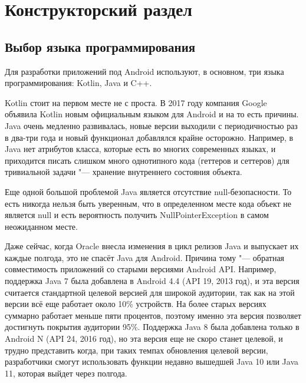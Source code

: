\chapter{Конструкторский раздел}
\label{ch:design}

\section{Выбор языка программирования}
\label{sec:language}
Для разработки приложений под Android используют, в основном, три языка программирования: Kotlin, Java и C++.

Kotlin стоит на первом месте не с проста.
В 2017 году компания Google объявила Kotlin новым официальным языком для Android и на то есть причины.
Java очень медленно развивалась, новые версии выходили с периодичностью раз в два-три года и новый функционал добавлялся крайне осторожно.
Например, в Java нет атрибутов класса, которые есть во многих современных языках, и приходится писать слишком много однотипного кода (геттеров и сеттеров) для тривиальной задачи "--- хранение внутреннего состояния объекта.

Еще одной большой проблемой Java является отсутствие null-безопасности.
То есть никогда нельзя быть уверенным, что в определенном месте кода объект не является null и есть вероятность получить NullPointerException в самом неожиданном месте.

Даже сейчас, когда Oracle внесла изменения в цикл релизов Java и выпускает их каждые полгода, это не спасёт Java для Android.
Причина тому "--- обратная совместимость приложений со старыми версиями Android API\@.
Например, поддержка Java 7 была добавлена в Android 4.4 (API 19, 2013 год), и эта версия считается стандартной целевой версией для широкой аудитории, так как на этой версии всё еще работает около 10\% устройств.
На более старых версиях суммарно работает меньше пяти процентов, поэтому именно эта версия позволяет достигнуть покрытия аудитории 95\%.
Поддержка Java 8 была добавлена только в Android N (API 24, 2016 год), но эта версия еще не скоро станет целевой, и трудно представить когда, при таких темпах обновления целевой версии, разработчики смогут использовать функции недавно вышедшей Java 10 или Java 11, которая выйдет через полгода.

